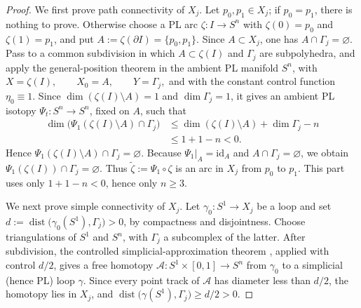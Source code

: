 \documentclass[12pt,oneside,a4paper]{article}
\theoremstyle{mytheorem}
\theoremstyle{remark}
\theoremstyle{definition}
\begin{document}
\begin{proof}
We first prove path connectivity of $X_j$.  Let $p_0,p_1\in X_j$; if
$p_0=p_1$, there is nothing to prove.  Otherwise choose a PL arc
$\zeta:I\to S^n$ with $\zeta(0)=p_0$ and $\zeta(1)=p_1$, and put
$A:=\zeta(\partial I)=\{p_0,p_1\}$.  Since $A\subset X_j$, one has
$A\cap\Gamma_j=\varnothing$.  Pass to a common subdivision in which
$A\subset\zeta(I)$ and $\Gamma_j$ are subpolyhedra, and apply the
general-position theorem \cite[Theorem~4.2]{zbMATH01714503} in the
ambient PL manifold $S^n$, with
$X=\zeta(I),\qquad X_0=A,\qquad Y=\Gamma_j,$
and with the constant control function $\eta_0\equiv1$.  Since
$\dim(\zeta(I)\setminus A)=1$ and $\dim\Gamma_j=1$, it gives an ambient
PL isotopy $\Psi_t:S^n\to S^n$, fixed on $A$, such that
\[
\begin{aligned}
 \dim\bigl(\Psi_1(\zeta(I)\setminus A)\cap\Gamma_j\bigr)
 &\leq\dim(\zeta(I)\setminus A)+\dim\Gamma_j-n\\
 &\leq1+1-n<0.
\end{aligned}
\]
Hence $\Psi_1(\zeta(I)\setminus A)\cap\Gamma_j=\varnothing$.  Because
$\Psi_1|_A=\mathrm{id}_A$ and $A\cap\Gamma_j=\varnothing$, we obtain
$\Psi_1(\zeta(I))\cap\Gamma_j=\varnothing$.  Thus
$\widetilde\zeta:=\Psi_1\circ\zeta$ is an arc in $X_j$ from $p_0$ to $p_1$.
This part uses only $1+1-n<0$, hence only $n\geq3$.

We next prove simple connectivity of $X_j$.  Let
$\gamma_0:S^1\to X_j$ be a loop and set
$d:=\operatorname{dist}\bigl(\gamma_0(S^1),\Gamma_j\bigr)>0$, by compactness
and disjointness.  Choose triangulations of \(S^1\) and \(S^n\), with
\(\Gamma_j\) a subcomplex of the latter.  After subdivision, the
controlled simplicial-approximation theorem
\cite[p.~222]{zbMATH01714503},
applied with control $d/2$, gives a free homotopy
$\mathcal A:S^1\times[0,1]\to S^n$ from $\gamma_0$ to a simplicial
(hence PL) loop $\gamma$.  Since every point track of $\mathcal A$ has
diameter less than $d/2$, the homotopy lies in $X_j$, and
$\operatorname{dist}\bigl(\gamma(S^1),\Gamma_j\bigr)\geq d/2>0$.


\end{proof}
\end{document}

